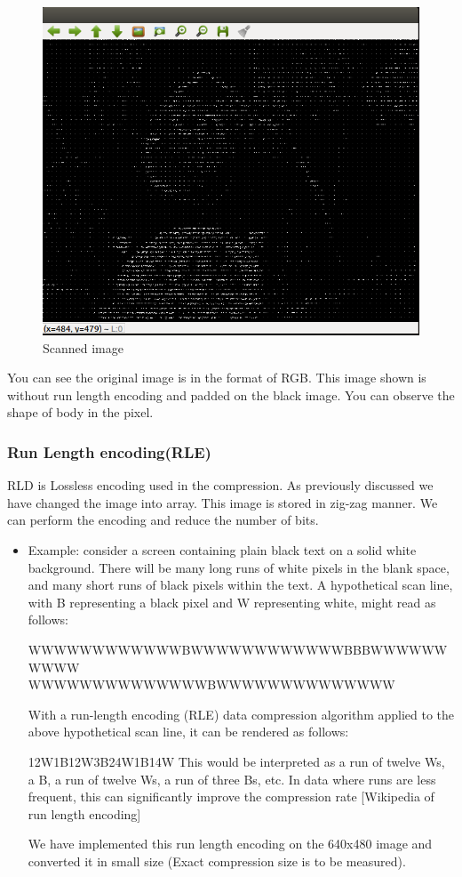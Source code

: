 \documentclass[a4paper]{article}
\begin{document}
\begin{figure}[H]
    \centering
    \includegraphics[scale=0.5]{encoded.png}
    \caption{Scanned image}
    \label{fig:my_label}
\end{figure}
You can see the original image is in the format of RGB. This image shown is without run length encoding and padded on the black image. You can observe the shape of body in the pixel.

\subsubsection{Run Length encoding(RLE)}
RLD is Lossless encoding used in the compression. As previously discussed we have changed the image into array. This image is stored in zig-zag manner. We can perform the encoding and reduce the number of bits.\\
\begin{itemize}
    \item Example: consider a screen containing plain black text on a solid white background. There will be many long runs of white pixels in the blank space, and many short runs of black pixels within the text. A hypothetical scan line, with B representing a black pixel and W representing white, might read as follows:

    WWWWWWWWWWWWBWWWWWWWWWWWWBBBWWWWWWWWWW\\
    WWWWWWWWWWWWWWBWWWWWWWWWWWWWW 

With a run-length encoding (RLE) data compression algorithm applied to the above hypothetical scan line, it can be rendered as follows:

    12W1B12W3B24W1B14W 
This would be interpreted as a run of twelve Ws, a B, a run of twelve Ws, a run of three Bs, etc. In data where runs are less frequent, this can significantly improve the compression rate
[Wikipedia of run length encoding]

We have implemented this run length encoding on the 640x480 image and converted it in small size (Exact compression size is to be measured).

\end{itemize}
\end{document}
